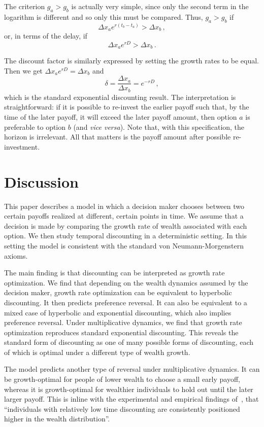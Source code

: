 \documentclass[11pt]{article}
\newcommand{\be}{\begin{equation}}
\newcommand{\ee}{\end{equation}}
\newcommand{\Dx}{\Delta x}
\newcommand{\del}{D}
\numberwithin{equation}{section}
\begin{document}
The criterion $g_a > g_b$ is actually very simple, since only the second term in the logarithm is different and so only this must be compared. Thus, $g_a > g_b$ if
\be
\Dx_a e^{r(t_b-t_a)} > \Dx_b\,,
\ee
or, in terms of the delay, if
\be
\Dx_a e^{r\del} > \Dx_b\,.
\ee

The discount factor is similarly expressed by setting the growth rates to be equal. Then we get $\Dx_a e^{r\del} = \Dx_b$ and
\be
\delta = \frac{\Dx_a}{\Dx_b} = e^{-r\del}\,,
\ee
which is the standard exponential discounting result. The interpretation is straightforward: if it is possible to re-invest the earlier payoff such that, by the time of the later payoff, it will exceed the later payoff amount, then option $a$ is preferable to option $b$ (and \textit{vice versa}). Note that, with this specification, the horizon is irrelevant. All that matters is the payoff amount after possible re-investment.

\section{Discussion}\label{sec:discussion}

This paper describes a model in which a decision maker chooses between two certain payoffs realized at different, certain points in time. We assume that a decision is made by comparing the growth rate of wealth associated with each option. We then study temporal discounting in a deterministic setting. In this setting the model is consistent with the standard von Neumann-Morgenstern axioms.

The main finding is that discounting can be interpreted as growth rate optimization. We find that depending on the wealth dynamics assumed by the decision maker, growth rate optimization can be equivalent to hyperbolic discounting. It then predicts preference reversal. It can also be equivalent to a mixed case of hyperbolic and exponential discounting, which also implies preference reversal. Under multiplicative dynamics, we find that growth rate optimization reproduces standard exponential discounting. This reveals the standard form of discounting as one of many possible forms of discounting, each of which is optimal under a different type of wealth growth.

The model predicts another type of reversal under multiplicative dynamics. It can be growth-optimal for people of lower wealth to choose a small early payoff, whereas it is growth-optimal for wealthier individuals to hold out until the later larger payoff. This is inline with the experimental and empirical findings of~\citet{epper2018time}, that ``individuals with relatively low time discounting are consistently positioned higher in the wealth distribution''.
\end{document}
